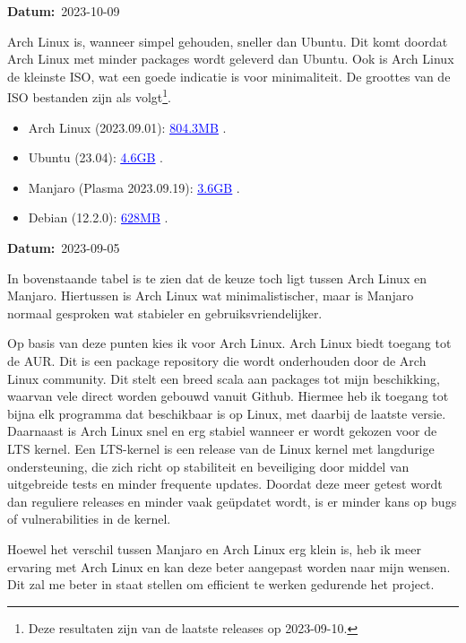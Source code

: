 \documentclass[a4paper]{report}
\newcommand{\styledhref}[2]{%
    \href{#1}{\textcolor{blue}{\underline{#2}}} %
}
\newcommand{\timestamp}[1]{
  \mbox{\scriptsize \textbf{Datum:} #1} \smallbreak
}
\begin{document}
\pagebreak 

\timestamp{2023-10-09}
Arch Linux is, wanneer simpel gehouden, sneller dan Ubuntu\cite{archvsubuntureddit}.
Dit komt doordat Arch Linux met minder packages wordt geleverd dan Ubuntu.
Ook is Arch Linux de kleinste ISO, wat een goede indicatie is voor minimaliteit. 
De groottes van de ISO bestanden zijn als volgt\footnote{Deze resultaten zijn van de laatste releases op 2023-09-10.}.
\begin{itemize}
  \item Arch Linux (2023.09.01): \styledhref{https://archlinux.org/download/}{804.3MB}.
  \item Ubuntu (23.04): \styledhref{https://ubuntu.com/download/desktop}{4.6GB}.
  \item Manjaro (Plasma 2023.09.19): \styledhref{https://download.manjaro.org/kde/23.0.2/manjaro-kde-23.0.2-230919-linux65.iso}{3.6GB}.
  \item Debian (12.2.0): \styledhref{https://www.debian.org/distrib/netinst\#smallcd}{628MB}.
\end{itemize}

\par\smallskip
\timestamp{2023-09-05}
In bovenstaande tabel is te zien dat de keuze toch ligt tussen Arch Linux en Manjaro.
Hiertussen is Arch Linux wat minimalistischer, maar is Manjaro normaal gesproken wat stabieler en gebruiksvriendelijker. 
\par\smallskip
Op basis van deze punten kies ik voor Arch Linux. 
Arch Linux biedt toegang tot de AUR. Dit is een package repository die wordt onderhouden door de Arch Linux community.
Dit stelt een breed scala aan packages tot mijn beschikking, waarvan vele direct worden gebouwd vanuit Github.
Hiermee heb ik toegang tot bijna elk programma dat beschikbaar is op Linux, met daarbij de laatste versie. 
Daarnaast is Arch Linux snel en erg stabiel wanneer er wordt gekozen voor de LTS kernel\cite{QuickTipsStableArch}.
Een LTS-kernel is een release van de Linux kernel met langdurige ondersteuning, die zich richt op stabiliteit en beveiliging door middel van uitgebreide tests en minder frequente updates.
Doordat deze meer getest wordt dan reguliere releases en minder vaak geüpdatet wordt, is er minder kans op bugs of vulnerabilities in de kernel\cite{enwiki:1177298994}.
\par\smallskip
Hoewel het verschil tussen Manjaro en Arch Linux erg klein is, heb ik meer ervaring met Arch Linux en kan deze beter aangepast worden naar mijn wensen. 
Dit zal me beter in staat stellen om efficient te werken gedurende het project.
\end{document}

